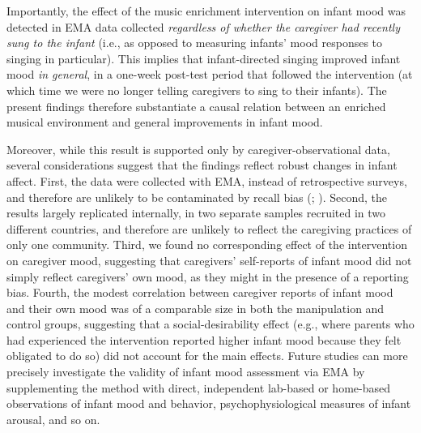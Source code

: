 \documentclass[
]{article}
\begin{document}
Importantly, the effect of the music enrichment intervention on infant
mood was detected in EMA data collected \emph{regardless of whether the
caregiver had recently sung to the infant} (i.e., as opposed to
measuring infants' mood responses to singing in particular). This
implies that infant-directed singing improved infant mood \emph{in
general}, in a one-week post-test period that followed the intervention
(at which time we were no longer telling caregivers to sing to their
infants). The present findings therefore substantiate a causal relation
between an enriched musical environment and general improvements in
infant mood.

Moreover, while this result is supported only by caregiver-observational
data, several considerations suggest that the findings reflect robust
changes in infant affect. First, the data were collected with EMA,
instead of retrospective surveys, and therefore are unlikely to be
contaminated by recall bias (; ). Second, the results largely
replicated internally, in two separate samples recruited in two
different countries, and therefore are unlikely to reflect the
caregiving practices of only one community. Third, we found no
corresponding effect of the intervention on caregiver mood, suggesting
that caregivers' self-reports of infant mood did not simply reflect
caregivers' own mood, as they might in the presence of a reporting bias.
Fourth, the modest correlation between caregiver reports of infant mood
and their own mood was of a comparable size in both the manipulation and
control groups, suggesting that a social-desirability effect (e.g.,
where parents who had experienced the intervention reported higher
infant mood because they felt obligated to do so) did not account for
the main effects. Future studies can more precisely investigate the
validity of infant mood assessment via EMA by supplementing the method
with direct, independent lab-based or home-based observations of infant
mood and behavior, psychophysiological measures of infant arousal, and
so on.
\end{document}
